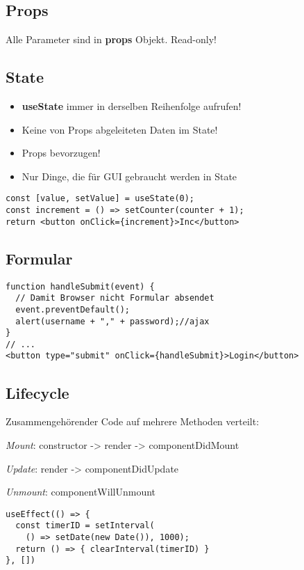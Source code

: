 \begin{multicols*}{2}
\subsection{Props}
Alle Parameter sind in \textbf{props} Objekt. Read-only!

\subsection{State}
\begin{itemize}
    \item \textbf{useState} immer in derselben Reihenfolge aufrufen!
    \item Keine von Props abgeleiteten Daten im State!
    \item Props bevorzugen!
    \item Nur Dinge, die für GUI gebraucht werden in State
\end{itemize}

\begin{verbatim}
const [value, setValue] = useState(0);
const increment = () => setCounter(counter + 1);
return <button onClick={increment}>Inc</button>
\end{verbatim}

\subsection{Formular}
\begin{verbatim}
function handleSubmit(event) {
  // Damit Browser nicht Formular absendet
  event.preventDefault();
  alert(username + "," + password);//ajax
}
// ...
<button type="submit" onClick={handleSubmit}>Login</button>
\end{verbatim}

\subsection{Lifecycle}
Zusammengehörender Code auf mehrere Methoden verteilt:

\textit{Mount}: constructor -> render -> componentDidMount

\textit{Update}: render -> componentDidUpdate

\textit{Unmount}: componentWillUnmount

\begin{verbatim}
useEffect(() => {
  const timerID = setInterval(
    () => setDate(new Date()), 1000);
  return () => { clearInterval(timerID) }
}, [])
\end{verbatim}


\end{multicols*}
